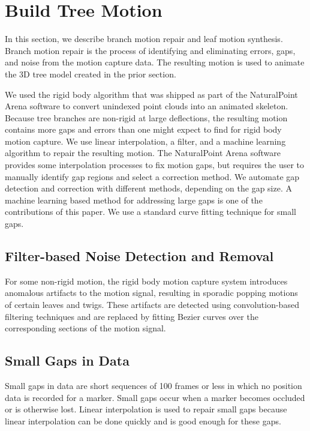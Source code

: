 \section{Build Tree Motion} 

In this section, we describe branch motion repair and leaf motion synthesis. Branch motion repair is the process of identifying and eliminating errors, gaps, and noise from the motion capture data. The resulting motion is used to animate the 3D tree model created in the prior section. 

We used the rigid body algorithm that was shipped as part of the NaturalPoint Arena software to convert unindexed point clouds into an animated skeleton. Because tree branches are non-rigid at large deflections, the resulting motion contains more gaps and errors than one might expect to find for rigid body motion capture. We use linear interpolation, a filter, and a machine learning algorithm to repair the resulting motion. The NaturalPoint Arena software provides some interpolation processes to fix motion gaps, but requires the user to manually identify gap regions and select a correction method. We automate gap detection and correction with different methods, depending on the gap size.  A machine learning based method for addressing large gaps is one of the contributions of this paper.  We use a standard curve fitting technique for small gaps. 

\subsection{Filter-based Noise Detection and Removal}

For some non-rigid motion, the rigid body motion capture system introduces anomalous artifacts to the motion signal, resulting in sporadic popping motions of certain leaves and twigs. These artifacts are detected using convolution-based filtering techniques and are replaced by fitting Bezier curves over the corresponding sections of the motion signal.  

\subsection{Small Gaps in Data}

Small gaps in data are short sequences of 100 frames or less in which no position data is recorded for a marker.  Small gaps occur when a marker becomes occluded or is otherwise lost.  Linear interpolation is used to repair small gaps because linear interpolation can be done quickly and is good enough for these gaps. 

